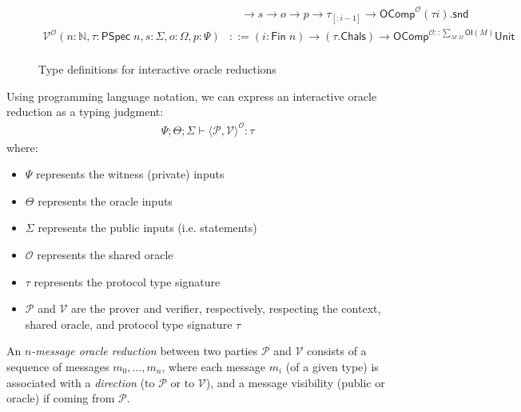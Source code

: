 \begin{figure}[t]
\begin{align*}
        & \quad \to s \to o \to p \to \tau_{[:i - 1]} \to \mathsf{OComp}^{\mathcal{O}} (\tau i).\mathsf{snd} \\
        \mathcal{V}^{\mathcal{O}} (n : \mathbb{N}, \tau : \mathsf{PSpec}\; n, s : \varSigma, o : \Omega, p : \Psi) &::= (i : \mathsf{Fin}\; n) \to (\tau.\mathsf{Chals}) \to \mathsf{OComp}^{\mathcal{O} :: \sum_{M : \Omega} \mathsf{OI}(M)} \mathsf{Unit} \\
    \end{align*}
    \caption{Type definitions for interactive oracle reductions}
    \label{fig:type-defs}
    \end{figure}

Using programming language notation, we can express an interactive oracle reduction as a typing judgment:
\begin{align*}
    \Psi; \Theta; \varSigma \vdash \langle\mathcal{P}, \mathcal{V}\rangle^{\mathcal{O}} : \tau
\end{align*}
where:
\begin{itemize}
    \item $\Psi$ represents the witness (private) inputs
    \item $\Theta$ represents the oracle inputs
    \item $\varSigma$ represents the public inputs (i.e. statements)
    \item $\mathcal{O}$ represents the shared oracle
    \item $\tau$ represents the protocol type signature
    \item $\mathcal{P}$ and $\mathcal{V}$ are the prover and verifier, respectively, respecting the context, shared oracle, and protocol type signature $\tau$
\end{itemize}

\begin{definition}
    \label{def:oracle_reduction_type_signature}
    An \emph{$n$-message oracle reduction} between two parties $\mathcal{P}$ and $\mathcal{V}$
    consists of a sequence of messages $m_0, \dots, m_n$, where each message $m_i$ (of a given
    type) is associated with a \emph{direction} (to $\mathcal{P}$ or to $\mathcal{V}$), and a
    message visibility (public or oracle) if coming from $\mathcal{P}$.
    

\end{definition}

